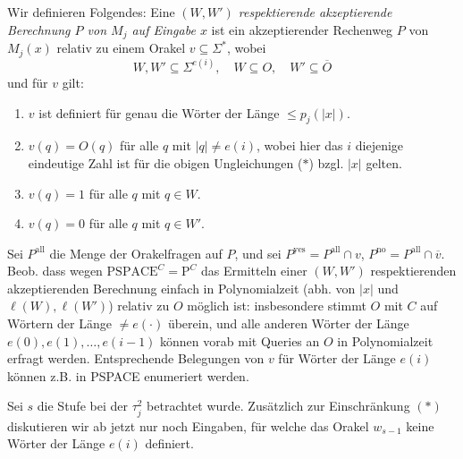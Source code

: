 \documentclass[nofonts]{uebung}
\def\P{\ensuremath{\mathrm{P}}}
\begin{document}
Wir definieren Folgendes: %
Eine \emph{$(W, W')$ respektierende akzeptierende Berechnung $P$ von $M_j$ auf Eingabe $x$} ist ein akzeptierender Rechenweg $P$ von $M_j(x)$ relativ zu einem Orakel $v\subseteq\Sigma^*$, wobei 
\[ W,W'\subseteq \Sigma^{e(i)}, \quad W\subseteq O, \quad W'\subseteq\overline{O} \]
und für $v$ gilt:
\begin{enumerate}[noitemsep,label=\arabic*.]
    \item $v$ ist definiert für genau die Wörter der Länge $\leq p_j(|x|)$.
    \item $v(q)=O(q)$ für alle $q$ mit $|q|\neq  e(i)$, wobei hier das $i$ diejenige eindeutige Zahl ist für die obigen Ungleichungen ($\ast$) bzgl. $|x|$ gelten.
    \item $v(q)=1$ für alle $q$ mit $q\in W$.
    \item $v(q)=0$ für alle $q$ mit $q\in W'$.
\end{enumerate}
Sei $P^\mathrm{all}$ die Menge der Orakelfragen auf $P$, und sei $P^\mathrm{yes}=P^\mathrm{all}\cap v$, $P^\mathrm{no}=P^\mathrm{all}\cap \overline{v}$.
Beob. dass wegen $\mathrm{PSPACE}^C=\P^C$ das Ermitteln einer $(W, W')$ respektierenden akzeptierenden Berechnung einfach in Polynomialzeit (abh. von $|x|$ und $\ell(W),\ell(W')$) relativ zu $O$ möglich ist: insbesondere stimmt $O$ mit $C$ auf Wörtern der Länge $\neq e(\cdot)$ überein, und alle anderen Wörter der Länge $e(0), e(1), \dots, e(i-1)$ können vorab mit Queries an $O$ in Polynomialzeit erfragt werden.
Entsprechende Belegungen von $v$ für Wörter der Länge $e(i)$ können z.B. in PSPACE enumeriert werden.

Sei $s$ die Stufe bei der $\tau^2_j$ betrachtet wurde.
Zusätzlich zur Einschränkung $(\ast)$ diskutieren wir ab jetzt nur noch Eingaben, für welche das Orakel $w_{s-1}$ keine Wörter der Länge $e(i)$ definiert.
\end{document}
